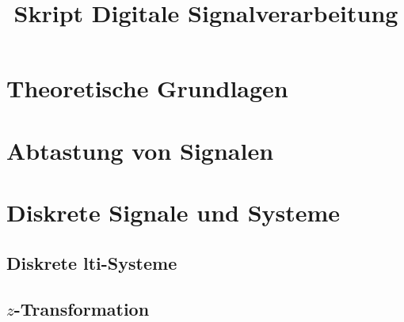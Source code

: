 \documentclass[ngerman]{article}
\title{Skript Digitale Signalverarbeitung}
\begin{document}

%
%
\section{Theoretische Grundlagen}\label{basics}
%

%
%
\section{Abtastung von Signalen}\label{sec:sampling}
%

%
%
%
\section{Diskrete Signale und Systeme}\label{disc_sys}
%

%
\subsection{Diskrete \texorpdfstring{\acrshort{lti}}{LTI}-Systeme}\label{sec:disc_lti}
%

%
%
\subsection{\texorpdfstring{$z$}{z}-Transformation}\label{ztrafo}
%

%

\end{document}
